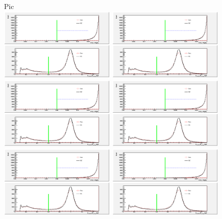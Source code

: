 \documentclass[12pt,a4paper,oneside]{article}
\begin{document}
\newpage
Pic\\
\includegraphics[width=2.2in,angle=0]{numerp_region.eps}
\includegraphics[width=2.2in,angle=0]{numerp_region.eps}\\
\includegraphics[width=2.2in,angle=0]{numerp_region.eps}
\includegraphics[width=2.2in,angle=0]{numerp_region.eps}\\
\includegraphics[width=2.2in,angle=0]{numerp_region.eps}
\includegraphics[width=2.2in,angle=0]{numerp_region.eps}\\
%
%
%
%
%
%
%
%
%
%
%
%
%
\end{document}
